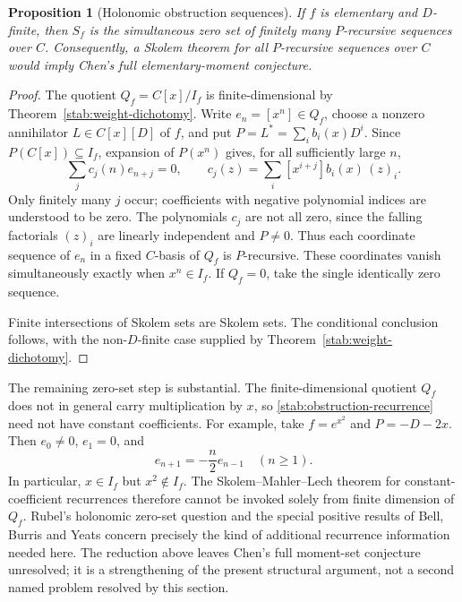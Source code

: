 \documentclass[11pt,a4paper]{article}
\newtheorem{proposition}[theorem]{Proposition}
\theoremstyle{definition}
\theoremstyle{remark}
\numberwithin{equation}{section}
\begin{document}
\begin{proposition}[Holonomic obstruction sequences]
\label{stab:moment-obstructions}
If $f$ is elementary and $D$-finite, then $S_f$ is the simultaneous
zero set of finitely many $P$-recursive sequences over $C$.
Consequently, a Skolem theorem for all $P$-recursive sequences over $C$
would imply Chen's full elementary-moment conjecture.
\end{proposition}
\begin{proof}
The quotient $Q_f=C[x]/I_f$ is finite-dimensional by
Theorem~\ref{stab:weight-dichotomy}.  Write $e_n=[x^n]\in Q_f$,
choose a nonzero annihilator $L\in C[x][D]$ of $f$, and put
$P=L^*=\sum_i b_i(x)D^i$.  Since $P(C[x])\subseteq I_f$,
expansion of $P(x^n)$ gives, for all sufficiently large $n$,
\begin{equation}\label{stab:obstruction-recurrence}
 \sum_j c_j(n)e_{n+j}=0,
 \qquad
 c_j(z)=\sum_i [x^{i+j}]b_i(x)\,(z)_i.
\end{equation}
Only finitely many $j$ occur; coefficients with negative polynomial
indices are understood to be zero.  The polynomials $c_j$ are not
all zero, since the falling factorials $(z)_i$ are linearly independent
and $P\ne0$.  Thus each coordinate sequence of $e_n$ in a fixed
$C$-basis of $Q_f$ is $P$-recursive.  These coordinates vanish
simultaneously exactly when $x^n\in I_f$.  If $Q_f=0$, take the
single identically zero sequence.

Finite intersections of Skolem sets are Skolem sets.  The conditional
conclusion follows, with the non-$D$-finite case supplied by
Theorem~\ref{stab:weight-dichotomy}.
\end{proof}

The remaining zero-set step is substantial.  The finite-dimensional
quotient $Q_f$ does not in general carry multiplication by $x$, so
\eqref{stab:obstruction-recurrence} need not have constant coefficients.
For example, take $f=e^{x^2}$ and $P=-D-2x$.  Then $e_0\ne0$,
$e_1=0$, and
\[
 e_{n+1}=-\frac n2 e_{n-1}\quad(n\geq1).
\]
In particular, $x\in I_f$ but $x^2\notin I_f$.  The
Skolem--Mahler--Lech theorem for constant-coefficient recurrences
therefore cannot be invoked solely from finite dimension of $Q_f$.
Rubel's holonomic zero-set question and the special positive results
of Bell, Burris and Yeats \cite{stab:BBY} concern precisely the kind of
additional recurrence information needed here.  The reduction above
leaves Chen's full moment-set conjecture unresolved; it is a
strengthening of the present structural argument, not a second named
problem resolved by this section.
\end{document}
